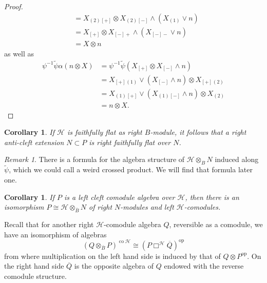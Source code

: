 \documentclass[a4paper,reqno]{amsart}
\numberwithin{equation}{section}
\theoremstyle{plain}
\newtheorem{cor}[thm]{Corollary}
\theoremstyle{remark}
\newtheorem{rem}[thm]{Remark}
\numberwithin{equation}{section}
\newcommand\inv{^{-1}}
\newcommand{\ot}{\otimes}
\newcommand\ol{\overline}
\renewcommand{\o}{{}_{\scriptscriptstyle{(1)}}}
\renewcommand{\t}{{}_{\scriptscriptstyle{(2)}}}
\newcommand\ou[1]{\otimes_{#1}}
\newcommand{\CH}{\mathcal{H}}
\newcommand{\op}{{\operatorname{op}}}
\newcommand\co{{\operatorname{co}}}
\begin{document}
\begin{proof}
\begin{align*}
    &=X\t{}_{[+]}\ot X\t{}_{[-]}\wedge (X\o\vee n)\\
    &=X_{[+]}\ot X_{[-]+}\wedge (X_{[-]-}\vee n)\\
    &=X\ot n
\end{align*}
as well as
\begin{align*}
    \psi\inv\tilde\psi\alpha(n\ot X)
    &=\psi\inv\tilde\psi( X_{[+]}\ot X_{[-]}\wedge n)\\
    &=X_{[+]}\o\vee (X_{[-]}\wedge n)\ot X_{[+]}\t\\ 
    &=X\o{}_{[+]}\vee (X\o{}_{[-]}\wedge n)\ot X\t\\
    &=n\ot X.
\end{align*}
\end{proof}


\begin{cor}\label{cor. right ff of weired basis}
  If $\CH$ is faithfully flat as right $B$-module, it follows that a right anti-cleft extension $N\subset P$ is right faithfully flat over $N$.
\end{cor}

\begin{rem}
    There is a formula for the algebra structure of $\CH\ou BN$ induced along $\tilde\psi$, which we could call a weird crossed product. We will find that formula later one. 
\end{rem}
\begin{cor}
    If $P$ is a left cleft comodule algebra over $\CH$, then there is an isomorphism $P\cong \CH\ou{\ol B}N$ of right $N$-modules and left $\CH$-comodules.
\end{cor}
Recall that for another right $\CH$-comodule algebra  $Q$,  reversible as a comodule, we have an isomorphism of algebras 
\[(Q\ou{\ol B}P)^{\co\CH}\cong (P\Box^\CH \ol Q)^\op\]
from \cite[Lemma~3.15]{HS25}
where multiplication on the left hand side is induced by that of $Q\ot P^{\op}$. On the right hand side $\ol Q$ is the opposite algebra of $Q$ endowed with the reverse comodule structure.
\end{document}
